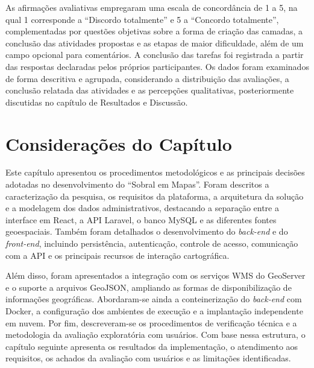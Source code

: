 As afirmações avaliativas empregaram uma escala de concordância de 1 a 5, na qual 1 corresponde a ``Discordo totalmente'' e 5 a ``Concordo totalmente'', complementadas por questões objetivas sobre a forma de criação das camadas, a conclusão das atividades propostas e as etapas de maior dificuldade, além de um campo opcional para comentários. A conclusão das tarefas foi registrada a partir das respostas declaradas pelos próprios participantes. Os dados foram examinados de forma descritiva e agrupada, considerando a distribuição das avaliações, a conclusão relatada das atividades e as percepções qualitativas, posteriormente discutidas no capítulo de Resultados e Discussão.

\section{Considerações do Capítulo}
\label{sec:consideracoes-metodologia}

Este capítulo apresentou os procedimentos metodológicos e as principais decisões adotadas no desenvolvimento do ``Sobral em Mapas''. Foram descritos a caracterização da pesquisa, os requisitos da plataforma, a arquitetura da solução e a modelagem dos dados administrativos, destacando a separação entre a interface em React, a API Laravel, o banco MySQL e as diferentes fontes geoespaciais. Também foram detalhados o desenvolvimento do \textit{back-end} e do \textit{front-end}, incluindo persistência, autenticação, controle de acesso, comunicação com a API e os principais recursos de interação cartográfica.

Além disso, foram apresentados a integração com os serviços WMS do GeoServer e o suporte a arquivos GeoJSON, ampliando as formas de disponibilização de informações geográficas. Abordaram-se ainda a conteinerização do \textit{back-end} com Docker, a configuração dos ambientes de execução e a implantação independente em nuvem. Por fim, descreveram-se os procedimentos de verificação técnica e a metodologia da avaliação exploratória com usuários. Com base nessa estrutura, o capítulo seguinte apresenta os resultados da implementação, o atendimento aos requisitos, os achados da avaliação com usuários e as limitações identificadas.